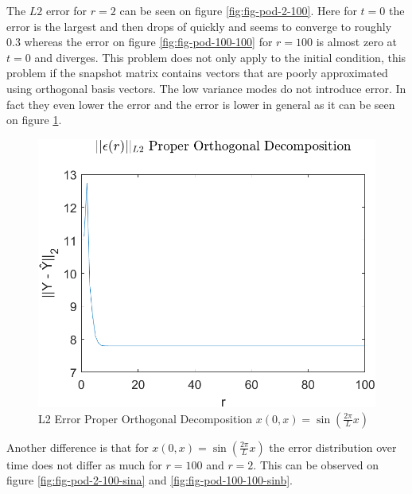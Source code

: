The \(L2\) error for \(r=2\) can be seen on figure \ref{fig:fig-pod-2-100}.
Here for \(t=0\) the error is the largest and then drops of quickly and seems to converge to roughly 0.3 whereas the error on figure \ref{fig:fig-pod-100-100} for \(r=100\) is almost zero at \(t=0\) and diverges.
This problem does not only apply to the initial condition, this problem if the snapshot matrix contains vectors that are poorly approximated using orthogonal basis vectors.
The low variance modes do not introduce error. 
In fact they even lower the error and the error is lower in general as it can be seen on figure \ref{FIG-ERR-POD-SIN}.
\begin{figure}[H]
\centering
\includegraphics[width=12.5cm]{images/L2_POD_SIN}
\caption{L2 Error Proper Orthogonal Decomposition $x(0, x) = \sin(\frac{2\pi}{L}x)$}
\label{FIG-ERR-POD-SIN}
\end{figure}
Another difference is that for $x(0, x) = \sin(\frac{2\pi}{L}x)$ the error distribution over time does not differ as much for \(r=100\) and \(r=2\).
This can be observed on figure \ref{fig:fig-pod-2-100-sina} and \ref{fig:fig-pod-100-100-sinb}.
